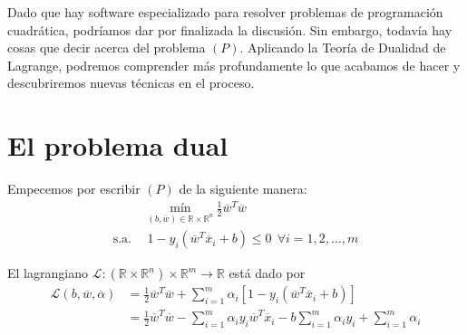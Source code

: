 \documentclass[11pt]{article}
\newcommand{\R}{\mathbb{R}}
\newcommand{\Rn}{\R^{n}}
\newcommand{\Rm}{\R^{m}}
\newcommand{\Rnu}{\R\times\Rn}
\newcommand{\av}{\overline{\alpha}}
\newcommand{\wv}{\overline{w}}
\newcommand{\x}{\overline{x}}
\newcommand{\Sm}{1,2,\ldots, m}
\newcommand{\La}{\mathcal{L}}
\newcommand{\ali}{\alpha_{i}}
\begin{document}
Dado que hay software especializado para resolver problemas de programación cuadrática, podríamos dar por finalizada la discusión. Sin embargo, todavía hay cosas que decir acerca del problema $(P)$. Aplicando la Teoría de Dualidad de Lagrange, podremos comprender más profundamente lo que acabamos de hacer y descubriremos nuevas técnicas en el proceso.

\section{El problema dual}
Empecemos por escribir $(P)$ de la siguiente manera:
\begin{equation*}
\begin{aligned}
& \underset{(b,\wv)\in \Rnu}{\text{mín}}\ \frac{1}{2}\wv^{T}\wv \\
\text{s.a.}\ \
& 1-y_{i}(\wv^{T}\x_{i}+b)\leq0\ \ \forall i=\Sm
\end{aligned}
\end{equation*}

El lagrangiano $\La:(\Rnu)\times\Rm\rightarrow\R$ está dado por
\begin{equation*}
\begin{aligned}
\La(b, \wv, \av)&=\frac{1}{2}\wv^{T}\wv+\sum_{i=1}^{m}\ali[1-y_{i}(\wv^{T}\x_{i}+b)]\\
&=\frac{1}{2}\wv^{T}\wv-\sum_{i=1}^{m}\ali y_{i}\wv^{T}\x_{i} -b\sum_{i=1}^{m}\ali y_{i}+\sum_{i=1}^{m}\ali
\end{aligned}
\end{equation*}
\end{document}
